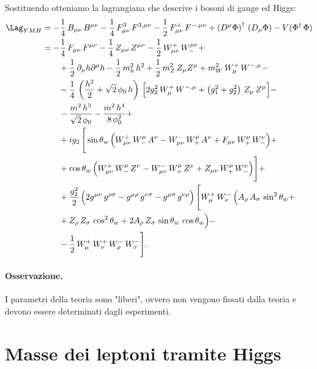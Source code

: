 Sostituendo otteniamo la lagrangiana che descrive i bosoni di gauge ed Higgs:
\begin{align}
    \Lag_{YMH} &= -\frac{1}{4}\, B_{\mu\nu}\, B^{\mu\nu} - \frac{1}{4}\, F_{\mu\nu}^3\, F^{3,\mu\nu} - \frac{1}{2}\, F_{\mu\nu}^+\, F^{-,\mu\nu} + \left(D^\mu\Phi\right)^\dagger\, \left(D_\mu\Phi\right) - V(\Phi^\dagger\, \Phi) \\
    &= -\frac{1}{4}\, F_{\mu\nu}\, F^{\mu\nu} - \frac{1}{4}\, Z_{\mu\nu}\, Z^{\mu\nu} - \frac{1}{2}\, W_{\mu\nu}^+\, W_-^{\mu\nu} + \notag \\
    &\qquad + \frac{1}{2}\, \partial_\mu h\partial^\mu h - \frac{1}{2}\, m_h^2\, h^2 + \frac{1}{2}\, m_Z^2\, Z_\mu Z^\mu + m_W^2\, W_\mu^+\, W^{-,\mu} - \notag \\
    &\qquad -\frac{1}{4}\, \left(\frac{h^2}{2} + \sqrt{2}\, \phi_0\, h\right)\, \Big[ 2g_2^2\, W_\mu^+\, W^{-,\mu} + \left( g_1^2 + g_2^2 \right)\, Z_\mu\, Z^\mu \Big] - \notag \\
    &\qquad - \frac{m^2\, h^3}{\sqrt{2}\, \phi_0} - \frac{m^2\, h^4}{8\, \phi_0^2} + \notag \\
    &\qquad + ig_2\, \Bigg[ \sin\theta_w\, \Big( W_{\mu\nu}^+\, W_-^\mu\, A^\nu - W_{\mu\nu}^-\, W_+^\mu\, A^\nu + F_{\mu\nu}\, W^\mu_+\, W_-^\nu \Big) + \notag \\
    &\qquad + \cos\theta_w\, \Big( W_{\mu\nu}^+\, W_-^\mu\, Z^\nu - W_{\mu\nu}^-\, W_+^\mu\, Z^\nu + Z_{\mu\nu}\, W^\mu_+\, W_-^\nu \Big) \Bigg] + \notag \\
    &\qquad + \frac{g_2^2}{2}\, \Big( 2g^{\mu\nu}\, g^{\rho\sigma} - g^{\mu\rho}\, g^{\nu\sigma} - g^{\mu\sigma}\, g^{\nu\rho} \Big)\, \Bigg[ W_\mu^+\, W_\nu^-\, \Big( A_\rho\, A_\sigma\, \sin^2\theta_w + \notag \\
    &\qquad + Z_\rho\, Z_\sigma\, \cos^2\theta_w + 2A_\rho\, Z_\sigma\, \sin\theta_w\, \cos\theta_w \Big) - \notag \\
    &\qquad - \frac{1}{2}\, W_\mu^+\, W_\nu^+\, W_\rho^-\, W_\sigma^- \Bigg].
\end{align}

\paragraph{Osservazione.}I parametri della teoria sono "liberi", ovvero non vengono fissati dalla teoria e devono essere determinati dagli esperimenti.


\section{Masse dei leptoni tramite Higgs}

